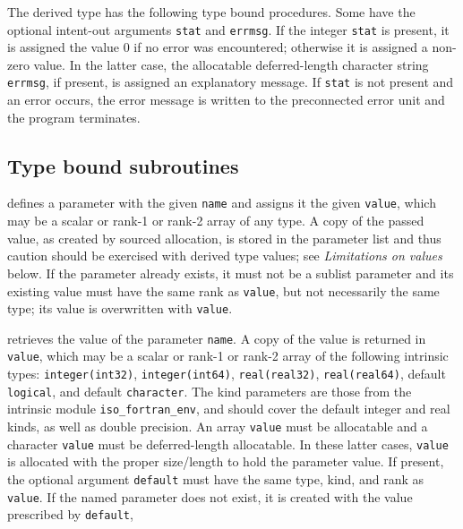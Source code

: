 \documentclass[11pt]{article}
\begin{document}
The derived type has the following type bound procedures.  Some have the
optional intent-out arguments \texttt{stat} and \texttt{errmsg}.  If the
integer \texttt{stat} is present, it is assigned the value 0 if no error
was encountered; otherwise it is assigned a non-zero value.  In the latter
case, the allocatable deferred-length character string \texttt{errmsg},
if present, is assigned an explanatory message.  If \texttt{stat} is not
present and an error occurs, the error message is written to the preconnected
error unit and the program terminates.

\subsection{Type bound subroutines}
\begin{description}[style=nextline]\setlength{\itemsep}{0pt}
\item[\texttt{set(name, value \Lbr,stat \Lbr,errmsg\Rbr\Rbr)}]
  defines a parameter with the given \texttt{name} and assigns it the given
  \texttt{value}, which may be a scalar or rank-1 or rank-2 array of any type.
  A copy of the passed value, as created by sourced allocation, is stored in the
  parameter list and thus caution should be exercised with derived type values; see
  \emph{Limitations on values} below.  If the parameter already exists, it must
  not be a sublist parameter and its existing value must have the same rank as
  \texttt{value}, but not necessarily the same type; its value is overwritten
  with \texttt{value}.
\item[\texttt{get(name, value \Lbr,default\Rbr\ \Lbr,stat \Lbr,errmsg\Rbr\Rbr)}]
  retrieves the value of the parameter \texttt{name}.  A copy of the value is
  returned in \texttt{value}, which may be a scalar or rank-1 or rank-2 array of
  the following intrinsic types: \texttt{integer(int32)}, \texttt{integer(int64)},
  \texttt{real(real32)}, \texttt{real(real64)}, default \texttt{logical}, and
  default \texttt{character}.  The kind parameters are those from the intrinsic module
  \texttt{iso_fortran_env}, and should cover the default integer and real kinds,
  as well as double precision.  An array \texttt{value} must be allocatable and
  a character \texttt{value} must be deferred-length allocatable.  In these
  latter cases, \texttt{value} is allocated with the proper size/length to hold
  the parameter value.  If present, the optional argument \texttt{default} must
  have the same type, kind, and rank as \texttt{value}. If the named parameter
  does not exist, it is created with the value prescribed by \texttt{default},

\end{description}
\end{document}
